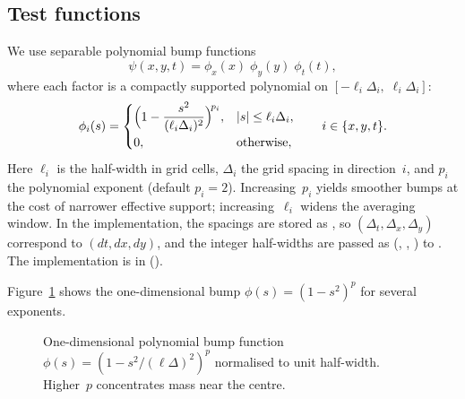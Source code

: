 \documentclass{report}
\theoremstyle{plain}
\theoremstyle{remark}
\numberwithin{equation}{section}              %
\begin{document}
\subsection{Test functions}
\label{subsec:test_functions}

We use separable polynomial bump functions
\begin{equation}
  \psi(x,y,t)
  = \phi_x(x)\;\phi_y(y)\;\phi_t(t),
  \label{eq:test_separable}
\end{equation}
where each factor is a compactly supported polynomial on
$[-\ell_i\Delta_i,\;\ell_i\Delta_i]$:
\begin{equation}
  \phi_i(s)
  = \begin{cases}
      \displaystyle
      \Bigl(1 - \frac{s^2}{(\ell_i\Delta_i)^2}\Bigr)^{\!p_i},
      & |s| \le \ell_i\Delta_i, \\[6pt]
      0, & \text{otherwise},
    \end{cases}
  \qquad i\in\{x,y,t\}.
  \label{eq:test_1d}
\end{equation}
Here $\ell_i$ is the half-width in grid cells, $\Delta_i$ the grid spacing
in direction~$i$, and $p_i$ the polynomial exponent (default $p_i=2$).
Increasing~$p_i$ yields smoother bumps at the cost of narrower effective
support; increasing~$\ell_i$ widens the averaging window.
In the implementation, the spacings are stored as
, so $(\Delta_t,\Delta_x,\Delta_y)$ correspond to
$(dt,dx,dy)$, and the integer half-widths are passed as
(, , ) to .
The implementation is in 
().

Figure~\ref{fig:test_bump} shows the one-dimensional bump
$\phi(s)=(1-s^2)^p$ for several exponents.

\begin{figure}[ht]
\centering
{}
\caption{One-dimensional polynomial bump function
$\phi(s)=(1-s^2/(\ell\Delta)^2)^{p}$ normalised to unit half-width.
Higher~$p$ concentrates mass near the centre.}
\label{fig:test_bump}
\end{figure}
\end{document}
